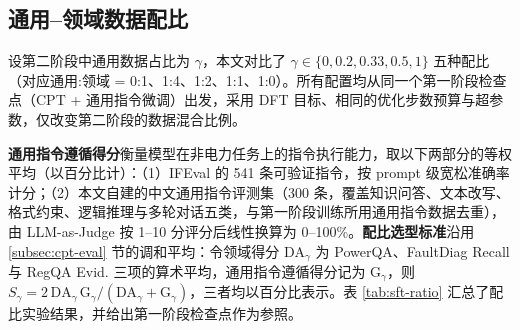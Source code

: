 \documentclass[fontset=fandol,type=master,campus=shenzhen,etitleauto=true]{hithesisbook}
\begin{document}
\subsection{通用--领域数据配比}\label{subsec:sft-ratio}

设第二阶段中通用数据占比为 $\gamma$，本文对比了 $\gamma \in \{0, 0.2, 0.33, 0.5, 1\}$ 五种配比（对应通用:领域 = 0:1、1:4、1:2、1:1、1:0）。所有配置均从同一个第一阶段检查点（CPT + 通用指令微调）出发，采用 DFT 目标、相同的优化步数预算与超参数，仅改变第二阶段的数据混合比例。

\textbf{通用指令遵循得分}衡量模型在非电力任务上的指令执行能力，取以下两部分的等权平均（以百分比计）：（1）IFEval\cite{ref85} 的 541 条可验证指令，按 prompt 级宽松准确率计分；（2）本文自建的中文通用指令评测集（300 条，覆盖知识问答、文本改写、格式约束、逻辑推理与多轮对话五类，与第一阶段训练所用通用指令数据去重），由 LLM-as-Judge 按 1--10 分评分后线性换算为 0--100\%。\textbf{配比选型标准}沿用 \ref{subsec:cpt-eval} 节的调和平均：令领域得分 $\text{DA}_\gamma$ 为 PowerQA、FaultDiag Recall 与 RegQA Evid. 三项的算术平均，通用指令遵循得分记为 $\text{G}_\gamma$，则 $S_\gamma = 2\,\text{DA}_\gamma\,\text{G}_\gamma / (\text{DA}_\gamma + \text{G}_\gamma)$，三者均以百分比表示。表 \ref{tab:sft-ratio} 汇总了配比实验结果，并给出第一阶段检查点作为参照。

\begin{table}[htbp]
\centering
\caption{SFT 第二阶段通用-领域数据配比实验结果}
\label{tab:sft-ratio}
\small
\setlength{\tabcolsep}{4pt}
\end{table}
\end{document}
